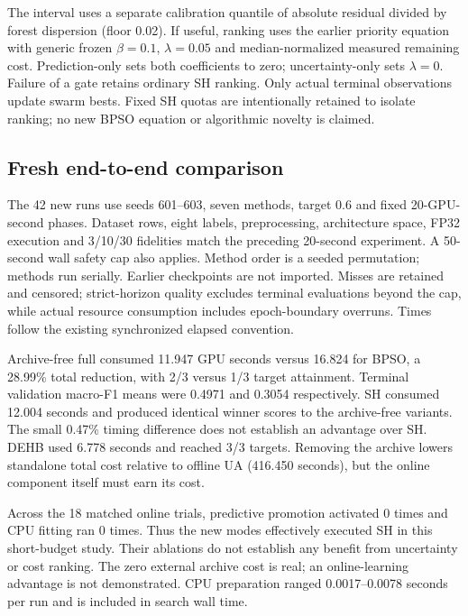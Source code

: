 The interval uses a separate calibration quantile of absolute residual divided by forest dispersion (floor 0.02). If useful, ranking uses the earlier priority equation with generic frozen $\beta=0.1$, $\lambda=0.05$ and median-normalized measured remaining cost. Prediction-only sets both coefficients to zero; uncertainty-only sets $\lambda=0$. Failure of a gate retains ordinary SH ranking. Only actual terminal observations update swarm bests. Fixed SH quotas are intentionally retained to isolate ranking; no new BPSO equation or algorithmic novelty is claimed.

\subsection{Fresh end-to-end comparison}
The 42 new runs use seeds 601--603, seven methods, target 0.6 and fixed 20-GPU-second phases. Dataset rows, eight labels, preprocessing, architecture space, FP32 execution and 3/10/30 fidelities match the preceding 20-second experiment. A 50-second wall safety cap also applies. Method order is a seeded permutation; methods run serially. Earlier checkpoints are not imported. Misses are retained and censored; strict-horizon quality excludes terminal evaluations beyond the cap, while actual resource consumption includes epoch-boundary overruns. Times follow the existing synchronized elapsed convention.

\begin{table}[!t]\centering\caption{Fresh target 0.6 runs, means across three search seeds. GPU seconds are measured; archive cost is charged to a standalone search. All misses are retained. Hits count actual terminal targets before the strict horizon.}\label{tab:online-quality}
\resizebox{\columnwidth}{!}{}\end{table}

Archive-free full consumed 11.947 GPU seconds versus 16.824 for BPSO, a 28.99\% total reduction, with 2/3 versus 1/3 target attainment. Terminal validation macro-F1 means were 0.4971 and 0.3054 respectively. SH consumed 12.004 seconds and produced identical winner scores to the archive-free variants. The small 0.47\% timing difference does not establish an advantage over SH. DEHB used 6.778 seconds and reached 3/3 targets. Removing the archive lowers standalone total cost relative to offline UA (416.450 seconds), but the online component itself must earn its cost.

Across the 18 matched online trials, predictive promotion activated 0 times and CPU fitting ran 0 times. Thus the new modes effectively executed SH in this short-budget study. Their ablations do not establish any benefit from uncertainty or cost ranking. The zero external archive cost is real; an online-learning advantage is not demonstrated. CPU preparation ranged 0.0017--0.0078 seconds per run and is included in search wall time.

